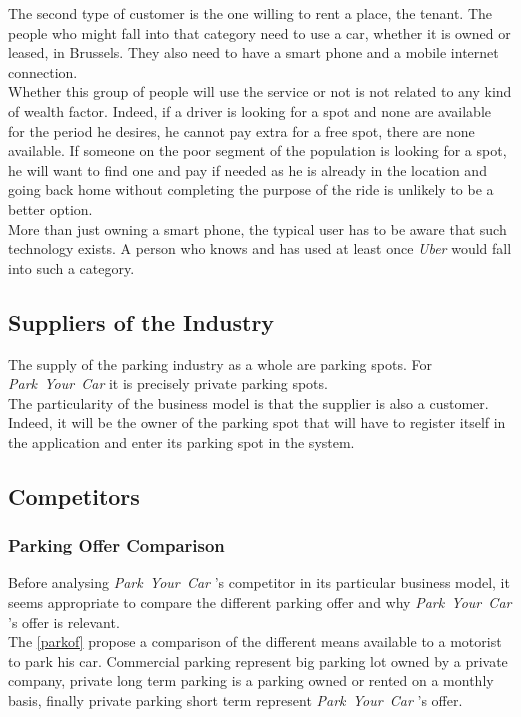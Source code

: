\documentclass[12pt,a4paper,oneside]{book}
\newcommand{\bp}{\textit{Park~Your~Car }}
\begin{document}
The second type of customer is the one willing to rent a place, the tenant. The people who might fall into that category need to use a car, whether it is owned or leased, in Brussels. They also need to have a smart phone and a mobile internet connection.\\
Whether this group of people will use the service or not is not related to any kind of wealth factor. Indeed, if a driver is looking for a spot and none are available for the period he desires, he cannot pay extra for a free spot, there are none available. If someone on the poor segment of the population is looking for a spot, he will want to find one and pay if needed as he is already in the location and going back home without completing the purpose of the ride is unlikely to be a better option.\\
More than just owning a smart phone, the typical user has to be aware that such technology exists. A person who knows and has used at least once \textit{Uber} would fall into such a category.

\subsection{Suppliers of the Industry}
The supply of the parking industry as a whole are parking spots. For \bp it is precisely private parking spots.\\
The particularity of the business model is that the supplier is also a customer. Indeed, it will be the owner of the parking spot that will have to register itself in the application and enter its parking spot in the system.

\subsection{Competitors}
\subsubsection{Parking Offer Comparison}
\label{poc}
Before analysing \bp 's competitor in its particular business model, it seems appropriate to compare the different parking offer and why \bp 's offer is relevant.\\

The \autoref{parkof} propose a comparison of the different means available to a motorist to park his car. Commercial parking represent big parking lot owned by a private company, private long term parking is a parking owned or rented on a monthly basis, finally private parking short term represent \bp 's offer.
\end{document}
